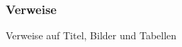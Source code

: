 \begin{frame}
    \frametitle{Verweise}
    \begin{block}{Verweise auf Titel, Bilder und Tabellen}
        
    \end{block}
\end{frame}
